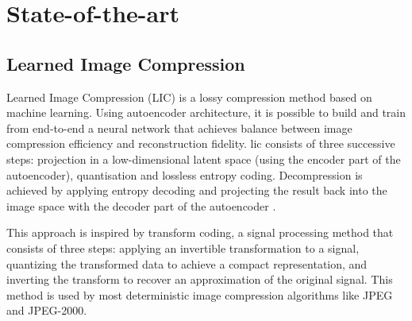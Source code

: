 \documentclass{article}
\begin{document}
\section{State-of-the-art}
\label{sota}

\subsection{Learned Image Compression}
Learned Image Compression (LIC) is a lossy compression method based on machine learning. Using autoencoder architecture, it is possible to build and train from end-to-end a neural network that achieves balance between image compression efficiency and reconstruction fidelity. \acrshort{lic} consists of three successive steps: projection in a low-dimensional latent space (using the encoder part of the autoencoder), quantisation and lossless entropy coding. Decompression is achieved by applying entropy decoding and projecting the result back into the image space with the decoder part of the autoencoder \cite{licmedium, licstanford}.

This approach is inspired by transform coding, a signal processing method that consists of three steps: applying an invertible transformation to a signal, quantizing the transformed data to achieve a compact representation, and inverting the transform to recover an approximation of the original signal. This method is used by most deterministic image compression algorithms like JPEG and JPEG-2000.
\end{document}
